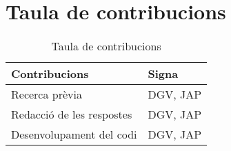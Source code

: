 \documentclass{article}
\title{\large \subject \\ \activity}
\author{Josep Alòs Pascual, Daniel Galan Vilella}
\date{\today}
\begin{document}
\maketitle


\section{Taula de contribucions}
\begin{table}
    \begin{tabular}{|l|l|}
        Contribucions & Signa \\\hline\hline
        Recerca prèvia & DGV, JAP \\\hline
        Redacció de les respostes & DGV, JAP \\\hline
        Desenvolupament del codi & DGV, JAP \\\hline
    \end{tabular}
    \caption{Taula de contribucions}
    \label{table:contribucions}
\end{table}
\end{document}

